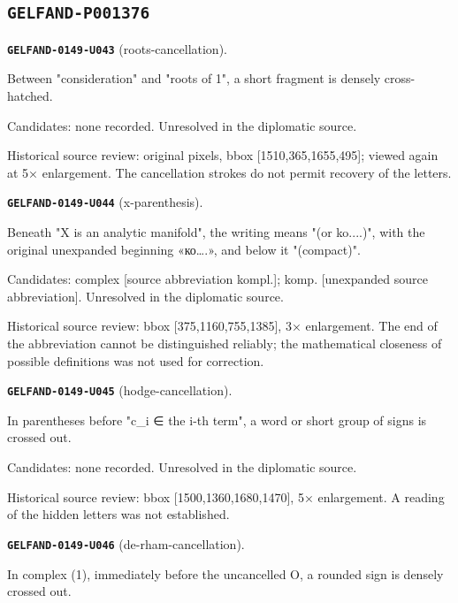\documentclass[11pt]{article}
\theoremstyle{definition}
\theoremstyle{remark}
\begin{document}
\subsection*{\texttt{GELFAND-P001376}}
\noindent\leavevmode{}\label{GELFAND-P001376:roots-cancellation:note}\textbf{\texttt{GELFAND-0149-U043}} (roots-cancellation).\par\nopagebreak[4]
Between "consideration" and "roots of 1", a short fragment is densely cross-hatched.\par
Candidates: none recorded. Unresolved in the diplomatic source.\par
Historical source review: original pixels, bbox [1510,365,1655,495]; viewed again at 5× enlargement. The cancellation strokes do not permit recovery of the letters.\par\medskip
\noindent\leavevmode{}\label{GELFAND-P001376:x-parenthesis:note}\textbf{\texttt{GELFAND-0149-U044}} (x-parenthesis).\par\nopagebreak[4]
Beneath "X is an analytic manifold", the writing means "(or ko....)", with the original unexpanded beginning «ко….», and below it "(compact)".\par
Candidates: complex [source abbreviation kompl.]; komp. [unexpanded source abbreviation]. Unresolved in the diplomatic source.\par
Historical source review: bbox [375,1160,755,1385], 3× enlargement. The end of the abbreviation cannot be distinguished reliably; the mathematical closeness of possible definitions was not used for correction.\par\medskip
\noindent\leavevmode{}\label{GELFAND-P001376:hodge-cancellation:note}\textbf{\texttt{GELFAND-0149-U045}} (hodge-cancellation).\par\nopagebreak[4]
In parentheses before "c\_i ∈ the i-th term", a word or short group of signs is crossed out.\par
Candidates: none recorded. Unresolved in the diplomatic source.\par
Historical source review: bbox [1500,1360,1680,1470], 5× enlargement. A reading of the hidden letters was not established.\par\medskip
\noindent\leavevmode{}\label{GELFAND-P001376:de-rham-cancellation:note}\textbf{\texttt{GELFAND-0149-U046}} (de-rham-cancellation).\par\nopagebreak[4]
In complex (1), immediately before the uncancelled O, a rounded sign is densely crossed out.\par
\end{document}
